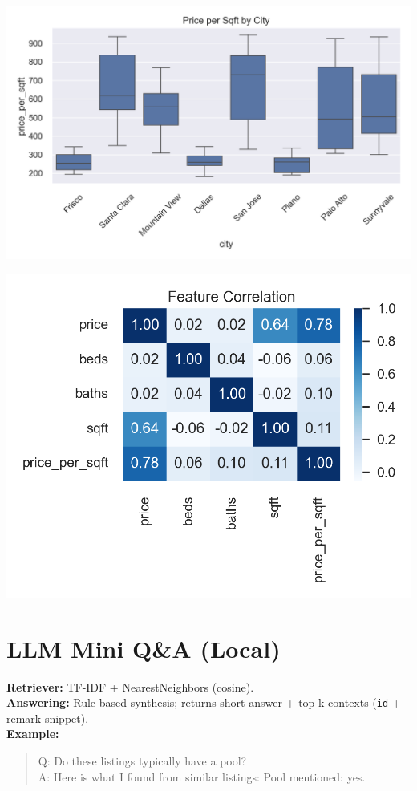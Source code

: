 \documentclass[11pt]{article}
\begin{document}
\begin{center}
\begin{minipage}[t]{0.48\linewidth}
  \centering
  \includegraphics[width=\linewidth]{fig_pps_by_city.png}
\end{minipage}\hfill
\begin{minipage}[t]{0.48\linewidth}
  \centering
  \includegraphics[width=\linewidth]{fig_corr_heatmap.png}
\end{minipage}

\end{center}

\section*{LLM Mini Q\&A (Local)}
\textbf{Retriever:} TF-IDF + NearestNeighbors (cosine).\\
\textbf{Answering:} Rule-based synthesis; returns short answer + top-k contexts (\texttt{id} + remark snippet).\\
\textbf{Example:}
\begin{quote}\small
Q: Do these listings typically have a pool?\\
A: Here is what I found from similar listings: Pool mentioned: yes.
\end{quote}
\end{document}
